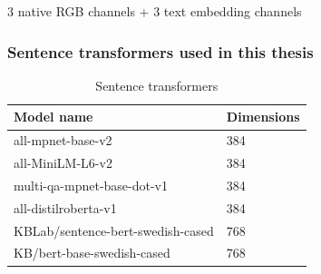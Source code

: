 \documentclass[aspectratio=1610]{beamer}
\makeatletter
\newcommand{\tikzcuboid@shiftx}{0}
\newcommand{\tikzcuboid@shifty}{0}
\newcommand{\tikzcuboid@dimx}{3}
\newcommand{\tikzcuboid@dimy}{3}
\newcommand{\tikzcuboid@dimz}{3}
\newcommand{\tikzcuboid@scale}{1}
\newcommand{\tikzcuboid@densityx}{1}
\newcommand{\tikzcuboid@densityy}{1}
\newcommand{\tikzcuboid@densityz}{1}
\newcommand{\tikzcuboid@rotation}{0}
\newcommand{\tikzcuboid@anglex}{0}
\newcommand{\tikzcuboid@angley}{90}
\newcommand{\tikzcuboid@anglez}{225}
\newcommand{\tikzcuboid@scalex}{1}
\newcommand{\tikzcuboid@scaley}{1}
\newcommand{\tikzcuboid@scalez}{sqrt(0.5)}
\newcommand{\tikzcuboid@linefront}{black}
\newcommand{\tikzcuboid@linetop}{black}
\newcommand{\tikzcuboid@lineright}{black}
\newcommand{\tikzcuboid@fillfront}{white}
\newcommand{\tikzcuboid@filltop}{white}
\newcommand{\tikzcuboid@fillright}{white}
\newcommand{\tikzcuboid@emphedge}{N}
\newcommand{\tikzcuboid@emphstyle}{thick}
\newcommand{\tikzcuboid}[1]{
    \setkeys{tikzcuboid}{#1} %
    \pgfmathsetmacro{\vectorxx}{\tikzcuboid@scalex*cos(\tikzcuboid@anglex)}
    \pgfmathsetmacro{\vectorxy}{\tikzcuboid@scalex*sin(\tikzcuboid@anglex)}
    \pgfmathsetmacro{\vectoryx}{\tikzcuboid@scaley*cos(\tikzcuboid@angley)}
    \pgfmathsetmacro{\vectoryy}{\tikzcuboid@scaley*sin(\tikzcuboid@angley)}
    \pgfmathsetmacro{\vectorzx}{\tikzcuboid@scalez*cos(\tikzcuboid@anglez)}
    \pgfmathsetmacro{\vectorzy}{\tikzcuboid@scalez*sin(\tikzcuboid@anglez)}
    \begin{scope}[xshift=\tikzcuboid@shiftx, yshift=\tikzcuboid@shifty, scale=\tikzcuboid@scale, rotate=\tikzcuboid@rotation, x={(\vectorxx,\vectorxy)}, y={(\vectoryx,\vectoryy)}, z={(\vectorzx,\vectorzy)}]
    \pgfmathsetmacro{\steppingx}{1/\tikzcuboid@densityx}
    \pgfmathsetmacro{\steppingy}{1/\tikzcuboid@densityy}
    \pgfmathsetmacro{\steppingz}{1/\tikzcuboid@densityz}
    \newcommand{\dimx}{\tikzcuboid@dimx}
    \newcommand{\dimy}{\tikzcuboid@dimy}
    \newcommand{\dimz}{\tikzcuboid@dimz}
    \pgfmathsetmacro{\secondx}{2*\steppingx}
    \pgfmathsetmacro{\secondy}{2*\steppingy}
    \pgfmathsetmacro{\secondz}{2*\steppingz}
    \foreach \x in {\steppingx,\secondx,...,\dimx}
    {   \foreach \y in {\steppingy,\secondy,...,\dimy}
        {   \pgfmathsetmacro{\lowx}{(\x-\steppingx)}
            \pgfmathsetmacro{\lowy}{(\y-\steppingy)}
            \filldraw[fill=\tikzcuboid@fillfront,draw=\tikzcuboid@linefront] (\lowx,\lowy,\dimz) -- (\lowx,\y,\dimz) -- (\x,\y,\dimz) -- (\x,\lowy,\dimz) -- cycle;

        }
    }
    \foreach \x in {\steppingx,\secondx,...,\dimx}
    {   \foreach \z in {\steppingz,\secondz,...,\dimz}
        {   \pgfmathsetmacro{\lowx}{(\x-\steppingx)}
            \pgfmathsetmacro{\lowz}{(\z-\steppingz)}
            \filldraw[fill=\tikzcuboid@filltop,draw=\tikzcuboid@linetop] (\lowx,\dimy,\lowz) -- (\lowx,\dimy,\z) -- (\x,\dimy,\z) -- (\x,\dimy,\lowz) -- cycle;
        }
    }
    \foreach \y in {\steppingy,\secondy,...,\dimy}
    {   \foreach \z in {\steppingz,\secondz,...,\dimz}
        {   \pgfmathsetmacro{\lowy}{(\y-\steppingy)}
            \pgfmathsetmacro{\lowz}{(\z-\steppingz)}
            \filldraw[fill=\tikzcuboid@fillright,draw=\tikzcuboid@lineright] (\dimx,\lowy,\lowz) -- (\dimx,\lowy,\z) -- (\dimx,\y,\z) -- (\dimx,\y,\lowz) -- cycle;
        }
    }
    \ifthenelse{\equal{\tikzcuboid@emphedge}{Y}}%
        {\draw[\tikzcuboid@emphstyle](0,\dimy,0) -- (\dimx,\dimy,0) -- (\dimx,\dimy,\dimz) -- (0,\dimy,\dimz) -- cycle;%
        \draw[\tikzcuboid@emphstyle] (0,0,\dimz) -- (0,\dimy,\dimz) -- (\dimx,\dimy,\dimz) -- (\dimx,0,\dimz) -- cycle;%
        \draw[\tikzcuboid@emphstyle](\dimx,0,0) -- (\dimx,\dimy,0) -- (\dimx,\dimy,\dimz) -- (\dimx,0,\dimz) -- cycle;%
        }%
        {}
    \end{scope}
}
\makeatother
\begin{document}
\begin{frame}
\begin{small}

3 native RGB channels + 3 text embedding channels
\end{small}
\end{frame}
\normalpage

\begin{frame}
  \frametitle{Sentence transformers used in this thesis}
\begin{table}[H]
  \begin{center}
    \caption{Sentence transformers}
    \label{tab:modeldimensions}
    \begin{tabular}{l|l}
    \textbf{Model name} & \textbf{Dimensions}  \\
    \hline
    all-mpnet-base-v2 & 384 \\    \hline
    all-MiniLM-L6-v2 & 384 \\    \hline
    multi-qa-mpnet-base-dot-v1 & 384 \\    \hline
    all-distilroberta-v1 & 384 \\    \hline
    KBLab/sentence-bert-swedish-cased & 768 \\    \hline
    KB/bert-base-swedish-cased & 768 \\    \hline
    \end{tabular}
  \end{center}
\end{table}
\end{frame}

\normalpage
\end{document}
